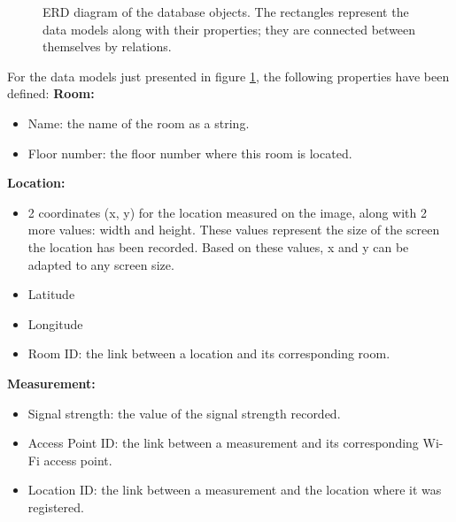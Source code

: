\begin{figure}[H]
    \centering
    \centering
    \caption{ERD diagram of the database objects. The rectangles represent the data models along with their properties; they are connected between themselves by relations.}
    \label{fig:erd-diagram}
\end{figure}

For the data models just presented in figure \ref{fig:erd-diagram}, the following properties have been defined:
\noindent\textbf{Room:}
\begin{itemize}
    \item Name: the name of the room as a string.
    \item Floor number: the floor number where this room is located.
\end{itemize}

\noindent\textbf{Location:}
\begin{itemize}
    \item 2 coordinates (x, y) for the location measured on the image, along with 2 more values: width and height. These values represent the size of the screen the location has been recorded. Based on these values, x and y can be adapted to any screen size.
    \item Latitude
    \item Longitude
    \item Room ID: the link between a location and its corresponding room.
\end{itemize}

\noindent\textbf{Measurement:}
\begin{itemize}
    \item Signal strength: the value of the signal strength recorded.
    \item Access Point ID: the link between a measurement and its corresponding Wi-Fi access point.
    \item Location ID: the link between a measurement and the location where it was registered.
\end{itemize}


